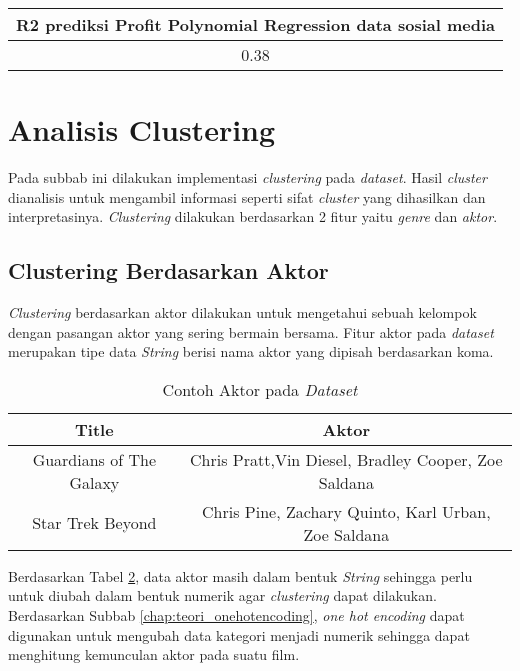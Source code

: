 \begin{table}[H]
\centering
\begin{tabular}{|c|}
\hline 
R2 prediksi Profit Polynomial Regression data sosial media \\ 
\hline 
0.38 \\ 
\hline 
\end{tabular} 
\label{tab:tab:r2_linear_profit_iterasi3}
\end{table}

\pagebreak

\section{Analisis Clustering} 
Pada subbab ini dilakukan implementasi \textit{clustering} pada \textit{dataset}. Hasil \textit{cluster} dianalisis untuk mengambil informasi seperti sifat \textit{cluster} yang dihasilkan dan interpretasinya. \textit{Clustering} dilakukan berdasarkan 2 fitur yaitu \textit{genre} dan \textit{aktor}.

\subsection{Clustering Berdasarkan Aktor} 
\textit{Clustering} berdasarkan aktor dilakukan untuk mengetahui sebuah kelompok dengan pasangan aktor yang sering bermain bersama. Fitur aktor pada \textit{dataset} merupakan tipe data \textit{String} berisi nama aktor yang dipisah berdasarkan koma. 

\begin{table}[H]
\caption{Contoh Aktor pada \textit{Dataset}}
\centering
\begin{tabular}{|c|c|}
\hline 
Title & Aktor \\ 
\hline 
Guardians of The Galaxy & Chris Pratt,Vin Diesel, Bradley Cooper, Zoe Saldana \\ 
\hline 
Star Trek Beyond        & Chris Pine, Zachary Quinto, Karl Urban, Zoe Saldana \\
\hline

\end{tabular} 
\label{tab:cluster_predataaktor}
\end{table}

Berdasarkan Tabel \ref{tab:cluster_predataaktor}, data aktor masih dalam bentuk \textit{String} sehingga perlu untuk diubah dalam bentuk numerik agar \textit{clustering} dapat dilakukan. Berdasarkan Subbab \ref{chap:teori_onehotencoding}, \textit{one hot encoding} dapat digunakan untuk mengubah data kategori  menjadi numerik sehingga dapat menghitung kemunculan aktor pada suatu film. 


